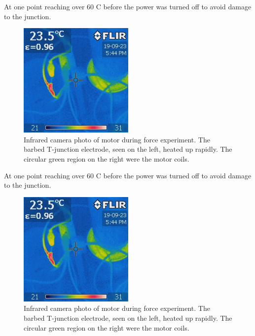 \documentclass[a4paper,12pt]{article}
\begin{document}
At one point reaching over 60 \degree C before the power was turned off to avoid damage to the junction.
\begin{figure}[h!]
    \centering
    \includegraphics[width=0.5\textwidth]{junctionheat2.jpg}
    \caption{Infrared camera photo of motor during force experiment. The barbed T-junction electrode, seen on the left, heated up rapidly. The circular green region on the right were the motor coils.}
    \label{fg:forceplot}
\end{figure}

At one point reaching over 60 \degree C before the power was turned off to avoid damage to the junction.
\begin{figure}[h!]
    \centering
    \includegraphics[width=0.5\textwidth]{junctionheat2.jpg}
    \caption{Infrared camera photo of motor during force experiment. The barbed T-junction electrode, seen on the left, heated up rapidly. The circular green region on the right were the motor coils.}
    \label{fg:forceplot}
\end{figure}
\end{document}

